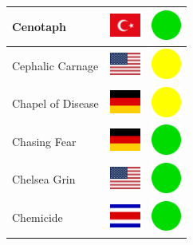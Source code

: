 \documentclass[12pt, a4paper, twoside]{report}
\begin{document}
\begin{center}
\begin{longtable}{|p{5cm}|p{2cm}|p{2cm}|}
 Cenotaph                                                   & \includegraphics[width=1cm]{../img/flags/tr} &   \includegraphics[width=1cm]{../likes/y} \\ \hline
 Cephalic Carnage                                           & \includegraphics[width=1cm]{../img/flags/us} &   \includegraphics[width=1cm]{../likes/m} \\ \hline
 Chapel of Disease                                          & \includegraphics[width=1cm]{../img/flags/de} &   \includegraphics[width=1cm]{../likes/m} \\ \hline
 Chasing Fear                                               & \includegraphics[width=1cm]{../img/flags/de} &   \includegraphics[width=1cm]{../likes/y} \\ \hline
 Chelsea Grin                                               & \includegraphics[width=1cm]{../img/flags/us} &   \includegraphics[width=1cm]{../likes/y} \\ \hline
 Chemicide                                                  & \includegraphics[width=1cm]{../img/flags/cr} &   \includegraphics[width=1cm]{../likes/y} \\ \hline

\end{longtable}
\end{center}
\end{document}

